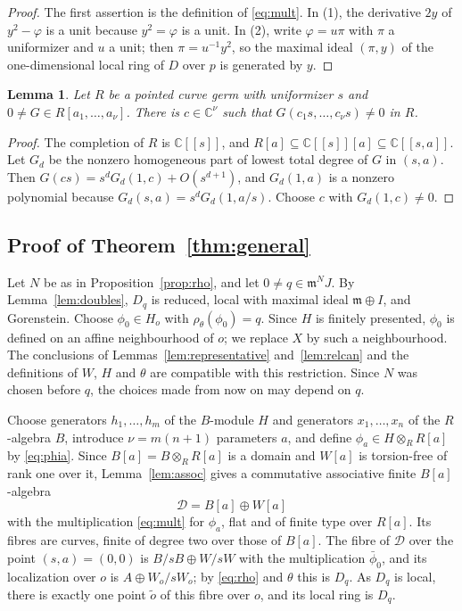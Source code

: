 \documentclass{amsart}
\newtheorem{lemma}[theorem]{Lemma}
\theoremstyle{definition}
\theoremstyle{remark}
\numberwithin{equation}{section}
\newcommand{\C}{\mathbb{C}}
\newcommand{\m}{\mathfrak{m}}
\begin{document}
\begin{proof}
The first assertion is the definition of \eqref{eq:mult}. In (1), the derivative $2y$ of $y^2-\varphi$ is a unit because $y^2=\varphi$ is a unit. In (2), write $\varphi=u\pi$ with $\pi$ a uniformizer and $u$ a unit; then $\pi=u^{-1}y^2$, so the maximal ideal $(\pi,y)$ of the one-dimensional local ring of $D$ over $p$ is generated by $y$.
\end{proof}

\begin{lemma}\label{lem:arcs}
Let $R$ be a pointed curve germ with uniformizer $s$ and $0\ne G\in R[a_1,\dots,a_\nu]$. There is $c\in\C^\nu$ such that $G(c_1s,\dots,c_\nu s)\ne0$ in $R$.
\end{lemma}

\begin{proof}
The completion of $R$ is $\C[[s]]$, and $R[a]\subseteq\C[[s]][a]\subseteq\C[[s,a]]$. Let $G_d$ be the nonzero homogeneous part of lowest total degree of $G$ in $(s,a)$. Then $G(cs)=s^dG_d(1,c)+O(s^{d+1})$, and $G_d(1,a)$ is a nonzero polynomial because $G_d(s,a)=s^dG_d(1,a/s)$. Choose $c$ with $G_d(1,c)\ne0$.
\end{proof}

\subsection{Proof of Theorem~\ref{thm:general}}
Let $N$ be as in Proposition~\ref{prop:rho}, and let $0\ne q\in\m^NJ$. By Lemma~\ref{lem:doubles}, $D_q$ is reduced, local with maximal ideal $\m\oplus I$, and Gorenstein. Choose $\phi_0\in H_o$ with $\rho_\theta(\phi_0)=q$. Since $H$ is finitely presented, $\phi_0$ is defined on an affine neighbourhood of $o$; we replace $X$ by such a neighbourhood. The conclusions of Lemmas~\ref{lem:representative} and~\ref{lem:relcan} and the definitions of $W$, $H$ and $\theta$ are compatible with this restriction. Since $N$ was chosen before $q$, the choices made from now on may depend on $q$.

Choose generators $h_1,\dots,h_m$ of the $B$-module $H$ and generators $x_1,\dots,x_n$ of the $R$-algebra $B$, introduce $\nu=m(n+1)$ parameters $a$, and define $\phi_a\in H\otimes_RR[a]$ by \eqref{eq:phia}. Since $B[a]=B\otimes_RR[a]$ is a domain and $W[a]$ is torsion-free of rank one over it, Lemma~\ref{lem:assoc} gives a commutative associative finite $B[a]$-algebra
\[
\mathcal D=B[a]\oplus W[a]
\]
with the multiplication \eqref{eq:mult} for $\phi_a$, flat and of finite type over $R[a]$. Its fibres are curves, finite of degree two over those of $B[a]$. The fibre of $\mathcal D$ over the point $(s,a)=(0,0)$ is $B/sB\oplus W/sW$ with the multiplication $\bar\phi_0$, and its localization over $o$ is $A\oplus W_o/sW_o$; by \eqref{eq:rho} and $\theta$ this is $D_q$. As $D_q$ is local, there is exactly one point $\tilde o$ of this fibre over $o$, and its local ring is $D_q$.
\end{document}
